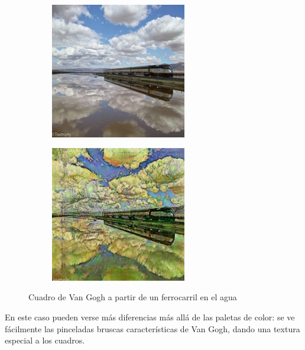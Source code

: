 \documentclass[[../main.tex]{subfiles}
\begin{document}
        \begin{figure}[!htb]
            \begin{subfigure}[b]{0.49\textwidth}
            \includegraphics[width=0.65\textwidth]{imagenes/imagen2cuadro/dataset/vangogh/2014-09-18 14_23_57.jpg}
            \end{subfigure}
        \hfill
            \begin{subfigure}[b]{0.49\textwidth}
            \includegraphics[width=0.65\textwidth]{imagenes/imagen2cuadro/dataset/vangogh/2014-09-18 14_23_57_2.jpg}
            \end{subfigure}
        \caption{Cuadro de Van Gogh a partir de un ferrocarril en el agua}
        \label{fig:vangogh_cuadro_tren_agua}
        \end{figure}
        
        En este caso pueden verse más diferencias más allá de las paletas de color: se ve fácilmente las pinceladas bruscas características de Van Gogh, dando una textura especial a los cuadros. 
        
\end{document}
